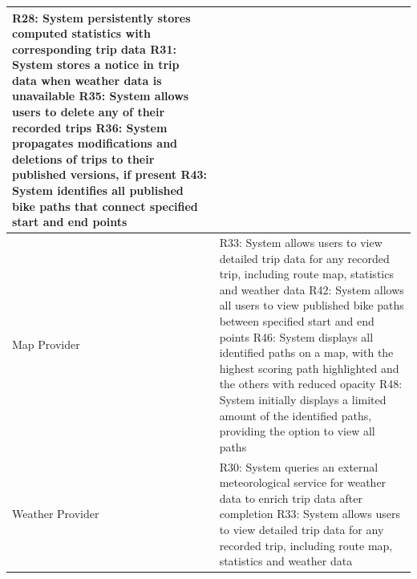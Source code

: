 \begin{longtable}{|p{3cm}|p{13cm}|}
   R28: System persistently stores computed statistics with corresponding trip data \newline
   R31: System stores a notice in trip data when weather data is unavailable \newline
   R35: System allows users to delete any of their recorded trips \newline
   R36: System propagates modifications and deletions of trips to their published versions, if present \newline
   R43: System identifies all published bike paths that connect specified start and end points \\ \hline
   Map Provider & 
   R33: System allows users to view detailed trip data for any recorded trip, including route map, statistics and weather data \newline
   R42: System allows all users to view published bike paths between specified start and end points \newline
   R46: System displays all identified paths on a map, with the highest scoring path highlighted and the others with reduced opacity \newline
   R48: System initially displays a limited amount of the identified paths, providing the option to view all paths \\ \hline
   Weather Provider & 
   R30: System queries an external meteorological service for weather data to enrich trip data after completion \newline
   R33: System allows users to view detailed trip data for any recorded trip, including route map, statistics and weather data \\ \hline

\end{longtable}